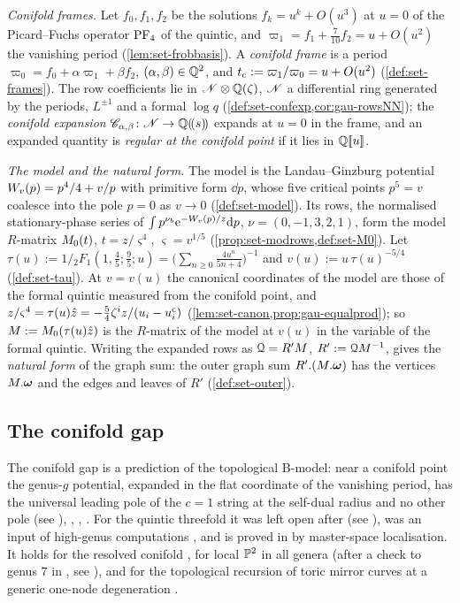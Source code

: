 \emph{Conifold frames.} Let $f_0,f_1,f_2$ be the solutions $f_k=u^k+O(u^3)$ at $u=0$ of the Picard--Fuchs operator $\mathrm{PF}_{4}$ of the quintic, and $\varpi_1=f_1+\frac7{10}f_2=u+O(u^2)$ the vanishing period (\cref{lem:set-frobbasis}). A \emph{conifold frame} is a period $\varpi_0=f_0+\alpha\varpi_1+\beta f_2$, $(\alpha,\beta)\in\mathbb{Q}^2$, and $t_{\mathrm{c}}:=\varpi_1/\varpi_0=u+O(u^2)$ (\cref{def:set-frames}). The row coefficients lie in $\mathscr{N}\otimes\mathbb{Q}(\zeta)$, $\mathscr{N}$ a differential ring generated by the periods, $L^{\pm1}$ and a formal $\log q$ (\cref{def:set-confexp,cor:gau-rowsNN}); the \emph{conifold expansion} $\mathscr{C}_{\alpha,\beta}\colon\mathscr{N}\to\mathbb{Q}(\!(s)\!)$ expands at $u=0$ in the frame, and an expanded quantity is \emph{regular at the conifold point} if it lies in $\mathbb{Q}[\![ u ]\!]$.

\emph{The model and the natural form.} The model is the Landau--Ginzburg potential $W_{v}(p)=p^4/4+v/p$ with primitive form $\dd p$, whose five critical points $p^5=v$ coalesce into the pole $p=0$ as $v\to0$ (\cref{def:set-model}). Its rows, the normalised stationary-phase series of $\int p^{\nu_b}\mathrm{e}^{-W_{v}(p)/z}\mathrm{d} p$, $\nu=(0,-1,3,2,1)$, form the model $R$-matrix $M_{0}(t)$, $t=z/\varsigma^4$, $\varsigma=v^{1/5}$ (\cref{prop:set-modrows,def:set-M0}). Let $\tau(u):=1/{}_2F_1(1,\frac45;\frac95;u)=\bigl(\sum_{n\geq0}\frac{4u^n}{5n+4}\bigr)^{-1}$ and $v(u):=u\,\tau(u)^{-5/4}$ (\cref{def:set-tau}). At $v=v(u)$ the canonical coordinates of the model are those of the formal quintic measured from the conifold point, and $z/\varsigma^4=\tau(u)\hat{z}=-\frac54\zeta^iz/(u_i-u_i^{\mathrm c})$ (\cref{lem:set-canon,prop:gau-equalprod}); so $M:=M_{0}(\tau(u)\hat{z})$ is the $R$-matrix of the model at $v(u)$ in the variable of the formal quintic. Writing the expanded rows as $\mathcal{Q}=R'M$, $R':=\mathcal{Q} M^{-1}$, gives the \emph{natural form} of the graph sum: the outer graph sum $R'.(M.\boldsymbol{\omega})$ has the vertices $M.\boldsymbol{\omega}$ and the edges and leaves of $R'$ (\cref{def:set-outer}).

\subsection{The conifold gap}
\label{sec:int-gap}

The conifold gap is a prediction of the topological B-model: near a conifold point the genus-$g$ potential, expanded in the flat coordinate of the vanishing period, has the universal leading pole of the $c=1$ string at the self-dual radius and no other pole \cite{Bershadsky:1993cx} (see \cite[\S1]{HKQ09}), \cite{Ghoshal:1995wm}, \cite[\S2.3]{HK07}, \cite[(1.2)]{HKQ09}. For the quintic threefold it was left open after \cite{GJR18,CGL21,CGL26} (see \cite[Remark~1.6]{GJR18}), was an input of high-genus computations \cite{HKQ09,LR22}, and is proved in \cite[Theorem~2]{CGYZ26} by master-space localisation. It holds for the resolved conifold \cite[\S1.1, footnote~1]{Br25}, for local $\mathbb{P}^2$ in all genera \cite{Br25} (after a check to genus $7$ in \cite{CI21}, see \cite[\S1.2]{Br25}), and for the topological recursion of toric mirror curves at a generic one-node degeneration \cite{FCCZ26}.

